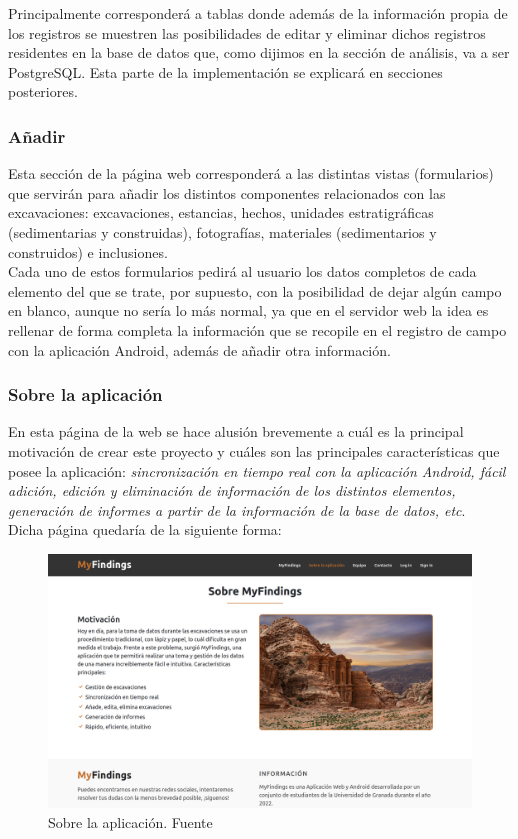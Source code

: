     Principalmente corresponderá a tablas donde además de la información propia
    de los registros se muestren las posibilidades de editar y eliminar dichos registros
    residentes en la base de datos que, como dijimos en la sección de análisis, va a ser
    PostgreSQL. Esta parte de la implementación se explicará en secciones posteriores.

    \subsubsection{Añadir}
    Esta sección de la página web corresponderá a las distintas vistas (formularios) que
    servirán para añadir los distintos componentes relacionados con las excavaciones:
    excavaciones, estancias, hechos, unidades estratigráficas (sedimentarias y construidas),
    fotografías, materiales (sedimentarios y construidos) e inclusiones.\\

    Cada uno de estos formularios pedirá al usuario los datos completos de cada elemento del
    que se trate, por supuesto, con la posibilidad de dejar algún campo en blanco, aunque
    no sería lo más normal, ya que en el servidor web la idea es rellenar de forma completa
    la información que se recopile en el registro de campo con la aplicación Android, además
    de añadir otra información.

    \subsubsection{Sobre la aplicación}
    En esta página de la web se hace alusión brevemente a cuál es la principal motivación
    de crear este proyecto y cuáles son las principales características que posee la
    aplicación: \textit{sincronización en tiempo real con la aplicación Android, fácil
    adición, edición y eliminación de información de los distintos elementos, generación
    de informes a partir de la información de la base de datos, etc}.\\

    Dicha página quedaría de la siguiente forma:
        
        \begin{figure}[H]
            \centering
            \includegraphics[scale=0.23]{imagenes/about.png}
            \caption[Sobre la aplicación]{Sobre la aplicación. Fuente \cite{petra-ad-deir}}
            \label{fig:about}
        \end{figure}

